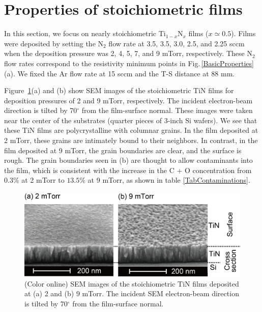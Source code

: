 \section{Properties of stoichiometric films}
\label{PROPERTIES OF STOICHIOMETRIC FILMS}

In this section, we focus on nearly stoichiometric Ti$_{1-x}$N$_{x}$ films ($x \simeq 0.5$).  Films were deposited by setting the N$_{2}$ flow rate at 3.5, 3.5, 3.0, 2.5, and 2.25 sccm when the deposition pressure was 2, 4, 5, 7, and 9 mTorr, respectively. These N$_{2}$ flow rates correspond to the resistivity minimum points in Fig.\,\ref{BasicProperties}(a). We fixed the Ar flow rate at 15 sccm and the T-S distance at 88 mm.

Figure \,\ref{SEM2-9}(a) and (b) show SEM images of the stoichiometric TiN films for deposition pressures of 2 and 9 mTorr, respectively. The incident electron-beam direction is tilted by 70$^{\circ}$ from the film-surface normal. These images were taken near the center of the substrates (quarter pieces of 3-inch Si wafers). We see that these TiN films are polycrystalline with columnar grains. In the film deposited at 2 mTorr, these grains are intimately bound to their neighbors. In contrast, in the film deposited at 9 mTorr, the grain boundaries are clear, and the surface is rough. The grain boundaries seen in (b) are thought to allow contaminants into the film, which is consistent with the increase in the C + O concentration from $0.3\%$ at 2 mTorr to $13.5\%$ at 9 mTorr, as shown in table \ref{TabContaminations}.

\begin{figure}
\begin{center}


\includegraphics[width=125mm]{SEM2-9.jpg}

\end{center}
\caption{(Color online) SEM images of the stoichiometric TiN films deposited at (a) 2 and (b) 9 mTorr. The incident SEM electron-beam direction is tilted by 70$^{\circ}$ from the film-surface normal.}
\label{SEM2-9}
\end{figure}


